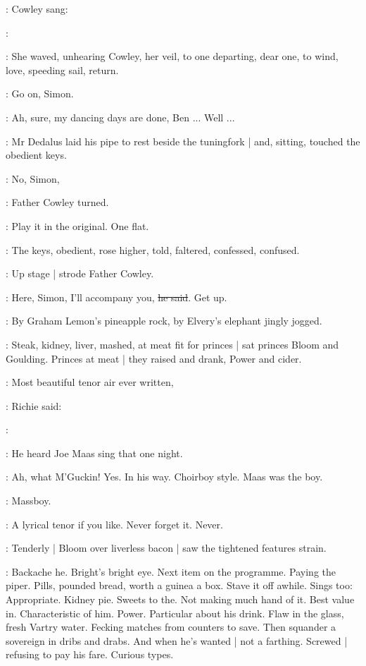 :
Cowley sang:

\cowley:

:
She waved,
unhearing Cowley,
her veil,
to one departing,
dear one,
to wind,
love,
speeding sail,
return.

\dollard:
Go on,
Simon.

\simon:
Ah,
sure,
my dancing days are done,
Ben ...
Well ...

:
Mr Dedalus laid his pipe to rest beside the tuningfork |
and,
sitting,
touched the obedient keys.

\cowley:
No,
Simon,

:
Father Cowley turned.

\cowley:
Play it in the original.
One flat.

:
The keys,
obedient,
rose higher,
told,
faltered,
confessed,
confused.

:
Up stage |
strode Father Cowley.

\cowley:
Here,
Simon,
I'll accompany you,
\sout{he said}.
Get up.

:
By Graham Lemon's pineapple rock,
by Elvery's elephant
jingly jogged.

:
Steak,
kidney,
liver,
mashed,
at meat fit for princes |
sat princes Bloom and Goulding.
Princes at meat |
they raised and drank,
Power and cider.

\goulding:
Most beautiful tenor air ever written,

:
Richie said:

\goulding:

:
He heard Joe Maas sing that one night.

\goulding:
Ah,
what M'Guckin!
Yes.
In his way.
Choirboy style.
Maas was the boy.

\BloomIntA:
Massboy.

\goulding:
A lyrical tenor if you like.
Never forget it.
Never.

:
Tenderly |
Bloom over liverless bacon |
saw the tightened features strain.

\BloomIntA:
Backache he.
Bright's bright eye.
Next item on the programme.
Paying the piper.
Pills,
pounded bread,
worth a guinea a box.
Stave it off awhile.
Sings too:
Appropriate.
Kidney pie.
Sweets to the.
Not making much hand of it.
Best value in.
Characteristic of him.
Power.
Particular about his drink.
Flaw in the glass,
fresh Vartry water.
Fecking matches from counters to save.
Then squander a sovereign
in dribs and drabs.
And when he's wanted |
not a farthing.
Screwed |
refusing to pay his fare.
Curious types.

